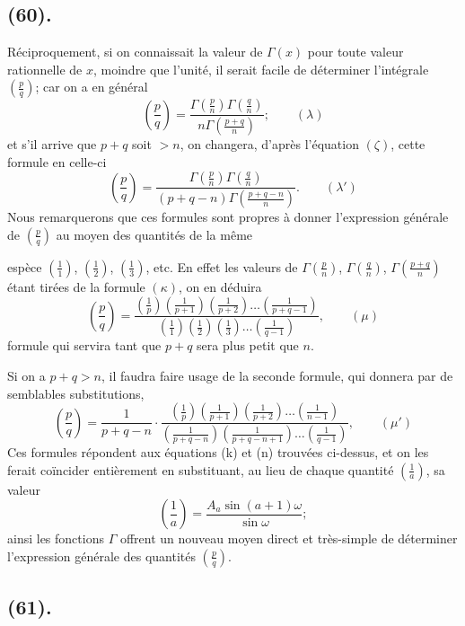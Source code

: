 \documentclass{article}
\begin{document}
\subsection*{(60).}

Réciproquement, si on connaissait la valeur de $\Gamma(x)$ pour toute valeur rationnelle de $x$, moindre que l'unité, il serait facile de déterminer l'intégrale $\left(\frac{p}{q}\right)$; car on a en général
\[ \left(\frac{p}{q}\right)=\frac{\Gamma\left(\frac{p}{n}\right)\Gamma\left(\frac{q}{n}\right)}{n\Gamma\left(\frac{p+q}{n}\right)};\qquad(\lambda) \]
et s'il arrive que $p+q$ soit $>n$, on changera, d'après l'équation $(\zeta)$, cette formule en celle-ci
\[ \left(\frac{p}{q}\right)=\frac{\Gamma\left(\frac{p}{n}\right)\Gamma\left(\frac{q}{n}\right)}{(p+q-n)\Gamma\left(\frac{p+q-n}{n}\right)}.\qquad(\lambda') \]
Nous remarquerons que ces formules sont propres à donner l'expression générale de $\left(\frac{p}{q}\right)$ au moyen des quantités de la même

espèce $\left(\frac{1}{1}\right)$, $\left(\frac{1}{2}\right)$, $\left(\frac{1}{3}\right)$, etc. En effet les valeurs de $\Gamma\left(\frac{p}{n}\right)$, $\Gamma\left(\frac{q}{n}\right)$, $\Gamma\left(\frac{p+q}{n}\right)$ étant tirées de la formule $(\kappa)$, on en déduira
\[ \left(\frac{p}{q}\right)=\frac{\left(\frac{1}{p}\right)\left(\frac{1}{p+1}\right)\left(\frac{1}{p+2}\right)\ldots\left(\frac{1}{p+q-1}\right)}{\left(\frac{1}{1}\right)\left(\frac{1}{2}\right)\left(\frac{1}{3}\right)\ldots\left(\frac{1}{q-1}\right)},\qquad(\mu) \]
formule qui servira tant que $p+q$ sera plus petit que $n$.

Si on a $p+q>n$, il faudra faire usage de la seconde formule, qui donnera par de semblables substitutions,
\[ \left(\frac{p}{q}\right)=\frac{1}{p+q-n}\cdot\frac{\left(\frac{1}{p}\right)\left(\frac{1}{p+1}\right)\left(\frac{1}{p+2}\right)\ldots\left(\frac{1}{n-1}\right)}{\left(\frac{1}{p+q-n}\right)\left(\frac{1}{p+q-n+1}\right)\ldots\left(\frac{1}{q-1}\right)},\qquad(\mu') \]
Ces formules répondent aux équations (k) et (n) trouvées ci-dessus, et on les ferait coïncider entièrement en substituant, au lieu de chaque quantité $\left(\frac{1}{a}\right)$, sa valeur
\[ \left(\frac{1}{a}\right)=\frac{A_{a}\sin(a+1)\omega}{\sin\omega}; \]
ainsi les fonctions $\Gamma$ offrent un nouveau moyen direct et très-simple de déterminer l'expression générale des quantités $\left(\frac{p}{q}\right)$.

\subsection*{(61).}
\end{document}
